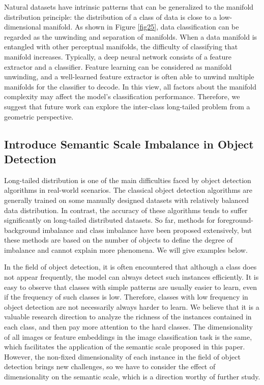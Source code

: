 \documentclass[10pt]{article} %
\begin{document}
Natural datasets have intrinsic patterns that can be generalized to the manifold distribution principle: the distribution of a class of data is close to a low-dimensional manifold. As shown in Figure \ref{fig25}, data classification can be regarded as the unwinding and separation of manifolds. When a data manifold is entangled with other perceptual manifolds, the difficulty of classifying that manifold increases. Typically, a deep neural network consists of a feature extractor and a classifier. Feature learning can be considered as manifold unwinding, and a well-learned feature extractor is often able to unwind multiple manifolds for the classifier to decode. In this view, all factors about the manifold complexity may affect the model's classification performance. Therefore, we suggest that future work can explore the inter-class long-tailed problem from a geometric perspective.


\subsection{Introduce Semantic Scale Imbalance in Object Detection\label{J.3}}

Long-tailed distribution is one of the main difficulties faced by object detection algorithms in real-world scenarios. The classical object detection algorithms are generally trained on some manually designed datasets with relatively balanced data distribution. In contrast, the accuracy of these algorithms tends to suffer significantly on long-tailed distributed datasets. So far, methods for foreground-background imbalance and class imbalance have been proposed extensively, but these methods are based on the number of objects to define the degree of imbalance and cannot explain more phenomena. We will give examples below.

In the field of object detection, it is often encountered that although a class does not appear frequently, the model can always detect such instances efficiently. It is easy to observe that classes with simple patterns are usually easier to learn, even if the frequency of such classes is low. Therefore, classes with low frequency in object detection are not necessarily always harder to learn. We believe that it is a valuable research direction to analyze the richness of the instances contained in each class, and then pay more attention to the hard classes. The dimensionality of all images or feature embeddings in the image classification task is the same, which facilitates the application of the semantic scale proposed in this paper. However, the non-fixed dimensionality of each instance in the field of object detection brings new challenges, so we have to consider the effect of dimensionality on the semantic scale, which is a direction worthy of further study.
\end{document}
